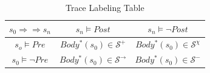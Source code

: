 \begin{table}[htb]
\centering
\begin{tabular}[float]{|c|c|c|}
\hline
$s_0 \Rightarrow \Rightarrow s_n$ & $s_n \models Post$            & $s_n \models \neg Post$\\
\hline
$s_o \models Pre$                 & $Body^*(s_0) \in \mathcal{S}^+$       & $Body^*(s_0) \in \mathcal{S}^\chi$\\
\hline
$s_0 \models \neg Pre$            & $Body^*(s_0) \in \mathcal{S}^\rightarrow$       & $Body^*(s_0) \in \mathcal{S}^-$\\
\hline
\end{tabular}
\caption{Trace Labeling Table}
\label{tab:labeling}
\end{table}

